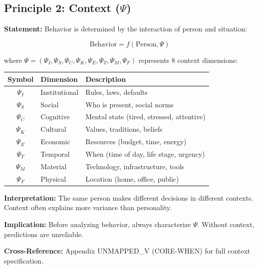 \subsection{Principle 2: Context ($\Psi$)}

\begin{tcolorbox}[colback=gray!5!white, colframe=gray!75!black,
    title=Axiom UNMAPPED_PR-2: Context Primacy]

\textbf{Statement:} Behavior is determined by the interaction of person and situation:

\begin{equation}
\text{Behavior} = f(\text{Person}, \Psi)
\end{equation}

where $\Psi = (\Psi_I, \Psi_S, \Psi_C, \Psi_K, \Psi_E, \Psi_T, \Psi_M, \Psi_F)$ represents 8 context dimensions:

\begin{table}[H]
\centering
\renewcommand{\arraystretch}{1.3}
\begin{tabular}{@{}cll@{}}
\toprule
\textbf{Symbol} & \textbf{Dimension} & \textbf{Description} \\
\midrule
$\Psi_I$ & Institutional & Rules, laws, defaults \\
$\Psi_S$ & Social & Who is present, social norms \\
$\Psi_C$ & Cognitive & Mental state (tired, stressed, attentive) \\
$\Psi_K$ & Cultural & Values, traditions, beliefs \\
$\Psi_E$ & Economic & Resources (budget, time, energy) \\
$\Psi_T$ & Temporal & When (time of day, life stage, urgency) \\
$\Psi_M$ & Material & Technology, infrastructure, tools \\
$\Psi_F$ & Physical & Location (home, office, public) \\
\bottomrule
\end{tabular}
\end{table}

\textbf{Interpretation:} The same person makes different decisions in different contexts. Context often explains more variance than personality.

\textbf{Implication:} Before analyzing behavior, always characterize $\Psi$. Without context, predictions are unreliable.

\textbf{Cross-Reference:} Appendix UNMAPPED_V (CORE-WHEN) for full context specification.

\end{tcolorbox}


